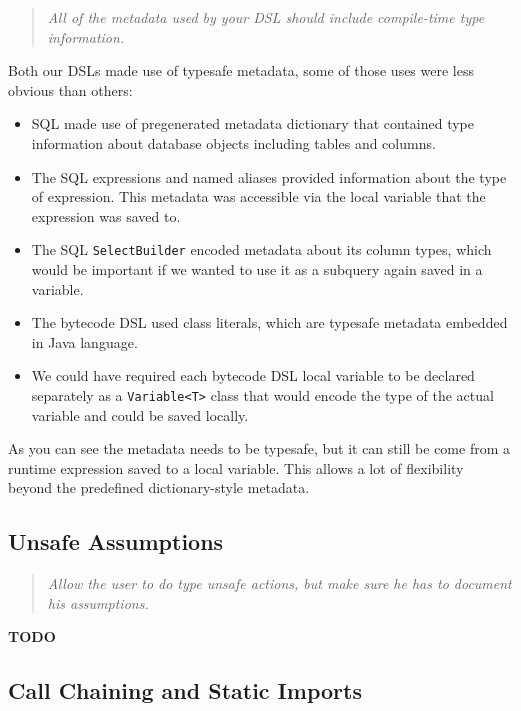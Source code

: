 \documentclass{sig-alternate}
\begin{document}
\begin{quote}
\emph{All of the metadata used by your DSL should include compile-time type information.}
\end{quote}

Both our DSLs made use of typesafe metadata, some of those uses were less obvious than others:
\begin{itemize}
\item SQL made use of pregenerated metadata dictionary that contained type information about database objects including tables and columns.
\item The SQL expressions and named aliases provided information about the type of expression. This metadata was accessible via the local variable that the expression was saved to.
\item The SQL \verb!SelectBuilder! encoded metadata about its column types, which would be important if we wanted to use it as a subquery again saved in a variable.
\item The bytecode DSL used class literals, which are typesafe metadata embedded in Java language.
\item We could have required each bytecode DSL local variable to be declared separately as a \verb!Variable<T>! class that would encode the type of the actual variable and could be saved locally.
\end{itemize}

As you can see the metadata needs to be typesafe, but it can still be come from a runtime expression saved to a local variable. This allows a lot of flexibility beyond the predefined dictionary-style metadata.

\subsection{Unsafe Assumptions}

\begin{quote}
\emph{Allow the user to do type unsafe actions, but make sure he has to document his assumptions.}
\end{quote}

\textbf{TODO}

\subsection{Call Chaining and Static Imports}
\end{document}

